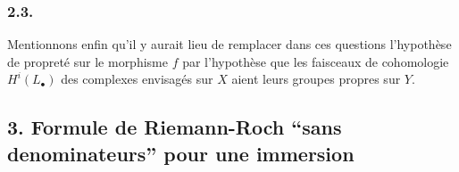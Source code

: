 \subsubsection*{2.3.}
Mentionnons enfin qu'il y aurait lieu de remplacer dans ces questions l'hypoth\`ese de propret\'e sur le morphisme $f$ par l'hypoth\`ese que les faisceaux de cohomologie $H^i(L_\bullet)$ des complexes envisag\'es sur $X$ aient leurs groupes propres sur $Y$.


\subsection*{3. Formule de Riemann-Roch ``sans denominateurs'' pour une immersion}

